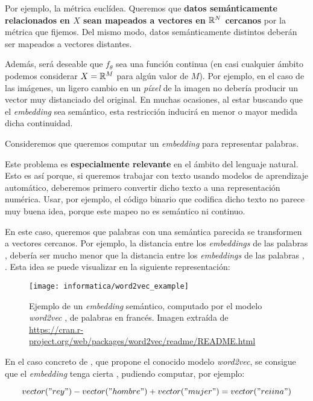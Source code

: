 Por ejemplo, la métrica euclídea. Queremos que \textbf{datos semánticamente relacionados en $X$ sean mapeados a vectores en $\mathbb{R}^N$ cercanos} por la métrica que fijemos. Del mismo modo, datos semánticamente distintos deberán ser mapeados a vectores distantes.

Además, será deseable que $f_{\theta}$ sea una función continua (en casi cualquier ámbito podemos considerar $X = \mathbb{R}^M$ para algún valor de $M$). Por ejemplo, en el caso de las imágenes, un ligero cambio en un \textit{píxel} de la imagen no debería producir un vector muy distanciado del original. En muchas ocasiones, al estar buscando que el \textit{embedding} sea semántico, esta restricción inducirá en menor o mayor medida dicha continuidad.

\begin{ejemplo}
    Consideremos que queremos computar un \textit{embedding} para representar palabras.

    Este problema es \textbf{especialmente relevante} en el ámbito del lenguaje natural. Esto es así porque, si queremos trabajar con texto usando modelos de aprendizaje automático, deberemos primero convertir dicho texto a una representación numérica. Usar, por ejemplo, el código binario que codifica dicho texto no parece muy buena idea, porque este mapeo no es semántico ni continuo.

    En este caso, queremos que palabras con una semántica parecida se transformen a vectores cercanos. Por ejemplo, la distancia entre los \textit{embeddings} de las palabras ,  debería ser mucho menor que la distancia entre los \textit{embeddings} de las palabras , . Esta idea se puede visualizar en la siguiente representación:

    \begin{figure}[H]
        \centering
        \texttt{[image: informatica/word2vec\_example]}
        \caption{Ejemplo de un \textit{embedding} semántico, computado por el modelo \textit{word2vec} \cite{informatica:word2vec}, de palabras en francés. Imagen extraída de \url{https://cran.r-project.org/web/packages/word2vec/readme/README.html}}
    \end{figure}

    En el caso concreto de \cite{informatica:word2vec}, que propone el conocido modelo \textit{word2vec}, se consigue que el \textit{embedding} tenga cierta , pudiendo computar, por ejemplo:

    \begin{equation}
        vector("rey") - vector("hombre") + vector("mujer") = vector("reiina")
    \end{equation}
\end{ejemplo}

